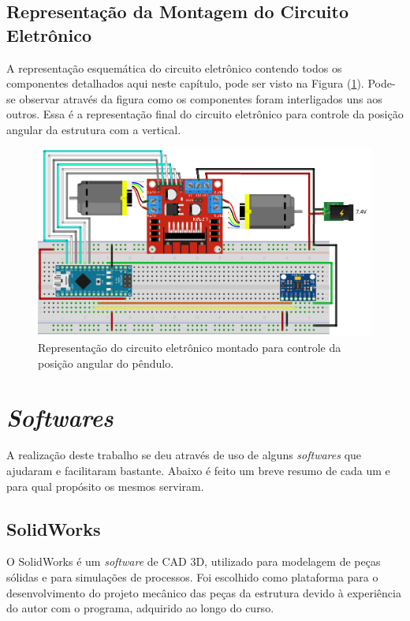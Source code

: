 \subsection{Representação da Montagem do Circuito Eletrônico}

A representação esquemática do circuito eletrônico contendo todos os componentes detalhados aqui neste capítulo, pode ser visto na Figura (\ref{fig:circuitoEletronicoPlanta}). Pode-se observar através da figura como os componentes foram interligados uns aos outros. Essa é a representação final do circuito eletrônico para controle da posição angular da estrutura com a vertical.

\begin{figure}[H]
\centering
\includegraphics[width=16cm]{Resultados/CircuitoEletronico.png}
\caption{Representação do circuito eletrônico montado para controle da posição angular do pêndulo.}
\label{fig:circuitoEletronicoPlanta}
\end{figure}

\section{\textit{Softwares}}

A realização deste trabalho se deu através de uso de alguns \textit{softwares} que ajudaram e facilitaram bastante. Abaixo é feito um breve resumo de cada um e para qual propósito os mesmos serviram.

\subsection{SolidWorks}

O SolidWorks é um \textit{software} de CAD 3D, utilizado para modelagem de peças sólidas e para simulações de processos. Foi escolhido como plataforma para o desenvolvimento do projeto mecânico das peças da estrutura devido à experiência do autor com o programa, adquirido ao longo do curso.

